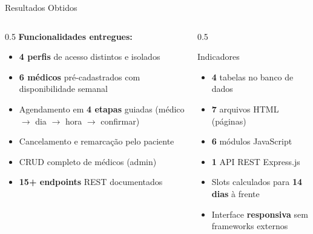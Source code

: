 \documentclass[xcolor={table}]{beamer}
\begin{document}
\begin{frame}{Resultados Obtidos}
    \begin{columns}
        \begin{column}{0.5\textwidth}
            \textbf{Funcionalidades entregues:}
            \begin{itemize}
                \item[\color{ClinicBlue}$\checkmark$] \textbf{4 perfis} de acesso distintos e isolados
                \item[\color{ClinicBlue}$\checkmark$] \textbf{6 médicos} pré-cadastrados com disponibilidade semanal
                \item[\color{ClinicBlue}$\checkmark$] Agendamento em \textbf{4 etapas} guiadas (médico $\to$ dia $\to$ hora $\to$ confirmar)
                \item[\color{ClinicBlue}$\checkmark$] Cancelamento e remarcação pelo paciente
                \item[\color{ClinicBlue}$\checkmark$] CRUD completo de médicos (admin)
                \item[\color{ClinicBlue}$\checkmark$] \textbf{15+ endpoints} REST documentados
            \end{itemize}
        \end{column}
        \begin{column}{0.5\textwidth}
            \begin{exampleblock}{Indicadores}
                \small
                \begin{itemize}
                    \item \textbf{4} tabelas no banco de dados
                    \item \textbf{7} arquivos HTML (páginas)
                    \item \textbf{6} módulos JavaScript
                    \item \textbf{1} API REST Express.js
                    \item Slots calculados para \textbf{14 dias} à frente
                    \item Interface \textbf{responsiva} sem frameworks externos
                \end{itemize}
            \end{exampleblock}
        \end{column}
    \end{columns}
\end{frame}
\end{document}
